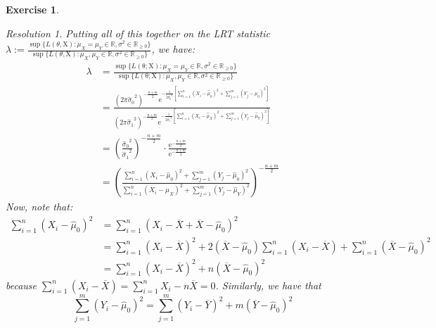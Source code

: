 \documentclass[10pt,a4paper]{article}
\newcommand{\vf}[1]{\boldsymbol{\mathrm{#1}}} %
\newcommand{\RR}{\ensuremath{\mathbb{R}}}
\theoremstyle{plain}
\newtheorem{exercice}{Exercise}
\theoremstyle{remark}
\newtheorem*{resolution}{Resolution}
\renewcommand{\exp}[1]{\mathrm{e}^{#1}} %
\begin{document}
\begin{exercice}
\begin{enumerate}
\begin{resolution}
            Putting all of this together on the LRT statistic $\displaystyle \lambda:=\frac{\sup\{L(\theta,\vf{X}):\mu_X=\mu_Y\in\RR,\sigma^2\in\RR_{\geq 0}\}}{\sup\{L(\theta,\vf{X}):\mu_X,\mu_Y\in\RR,\sigma^2\in\RR_{\geq 0}\}}$, we have:
            \begin{align}
              \nonumber \lambda & =\frac{\sup\{L(\vf\theta;\vf{X}):\mu_X=\mu_Y\in\RR,\sigma^2\in\RR_{\geq 0}\}}{\sup\{L(\vf\theta;\vf{X}):\mu_X,\mu_Y\in\RR,\sigma^2\in\RR_{\geq 0}\}}                                                                                                                                                                     \\
              \nonumber         & =\frac{{(2\pi{\hat\sigma_0}^2)}^{-\frac{n+m}{2}}\exp{-\frac{1}{2{\hat\sigma_0}^2}\left[\sum_{i=1}^n{(X_i-\hat\mu_0)}^2+\sum_{j=1}^m{(Y_j-\hat\mu_0)}^2\right]}}{{(2\pi{\hat\sigma_1}^2)}^{-\frac{n+m}{2}}\exp{-\frac{1}{2{\hat\sigma_1}^2}\left[\sum_{i=1}^n{(X_i-\hat\mu_X)}^2+\sum_{j=1}^m{(Y_j-\hat\mu_Y)}^2\right]}} \\
              \nonumber         & = \left(\frac{{\hat\sigma_0}^2}{{\hat\sigma_1}^2}\right)^{-\frac{n+m}{2}}\cdot\frac{\exp{-\frac{n+m}{2}}}{\exp{-\frac{n+m}{2}}}                                                                                                                                                                                          \\
              \label{lambda}    & = \left(\frac{\sum_{i=1}^n{(X_i-\hat\mu_0)}^2+\sum_{j=1}^m{(Y_j-\hat\mu_0)}^2}{\sum_{i=1}^n{(X_i-\hat\mu_X)}^2+\sum_{j=1}^m{(Y_j-\hat\mu_Y)}^2}\right)^{-\frac{n+m}{2}}
            \end{align}
            Now, note that:
            \begin{align*}
              \sum_{i=1}^n{(X_i-\hat\mu_0)}^2 & =\sum_{i=1}^n{(X_i-\overline{X}+\overline{X}-\hat\mu_0)}^2                                                                           \\
                                              & =\sum_{i=1}^n{(X_i-\overline{X})}^2+2(\overline{X}-\hat\mu_0)\sum_{i=1}^n(X_i-\overline{X})+\sum_{i=1}^n{(\overline{X}-\hat\mu_0)}^2 \\
                                              & =\sum_{i=1}^n{(X_i-\overline{X})}^2+n{(\overline{X}-\hat\mu_0)}^2
            \end{align*}
            because $\sum_{i=1}^n(X_i-\overline{X})=\sum_{i=1}^nX_i-n\overline{X}=0$. Similarly, we have that $$\sum_{j=1}^m{(Y_i-\hat\mu_0)}^2=\sum_{j=1}^m{(Y_i-\overline{Y})}^2+m{(\overline{Y}-\hat\mu_0)}^2$$

\end{resolution}
\end{enumerate}
\end{exercice}
\end{document}
